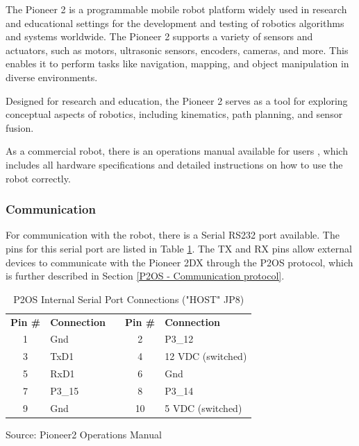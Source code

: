 \documentclass[../monografia.tex]{subfiles}
\begin{document}
The Pioneer 2 is a programmable mobile robot platform widely used in research and educational settings for the development and testing of robotics algorithms and systems worldwide. The Pioneer 2 supports a variety of sensors and actuators, such as motors, ultrasonic sensors, encoders, cameras, and more. This enables it to perform tasks like navigation, mapping, and object manipulation in diverse environments.

Designed for research and education, the Pioneer 2 serves as a tool for exploring conceptual aspects of robotics, including kinematics, path planning, and sensor fusion.

As a commercial robot, there is an operations manual available for users \cite{pioneer2dx_2024}, which includes all hardware specifications and detailed instructions on how to use the robot correctly.

\subsubsection{Communication}

For communication with the robot, there is a Serial RS232 port available. The pins for this serial port are listed in Table \ref{table: P2OS Internal Serial Port Connections ("HOST" JP8)}. The TX and RX pins allow external devices to communicate with the Pioneer 2DX through the P2OS protocol, which is further described in Section \ref{P2OS - Communication protocol}.


\begin{table}[h!]
\centering
\caption{P2OS Internal Serial Port Connections ("HOST" JP8)}
\label{table: P2OS Internal Serial Port Connections ("HOST" JP8)}
\begin{tabular}{|c|l|l|c|l|}
\cline{1-2} \cline{4-5}
\textbf{Pin \#} & \textbf{Connection} &  & \textbf{Pin \#} & \textbf{Connection} \\ \cline{1-2} \cline{4-5} 
1               & Gnd                 &  & 2               & P3\_12              \\ \cline{1-2} \cline{4-5} 
3               & TxD1                &  & 4               & 12 VDC (switched)   \\ \cline{1-2} \cline{4-5} 
5               & RxD1                &  & 6               & Gnd                 \\ \cline{1-2} \cline{4-5} 
7               & P3\_15              &  & 8               & P3\_14              \\ \cline{1-2} \cline{4-5} 
9               & Gnd                 &  & 10              & 5 VDC (switched)    \\ \cline{1-2} \cline{4-5} 
\end{tabular}

\vspace{2mm}

Source: Pioneer2 Operations Manual \cite{pioneer2dx_2024}
\end{table}
\end{document}
